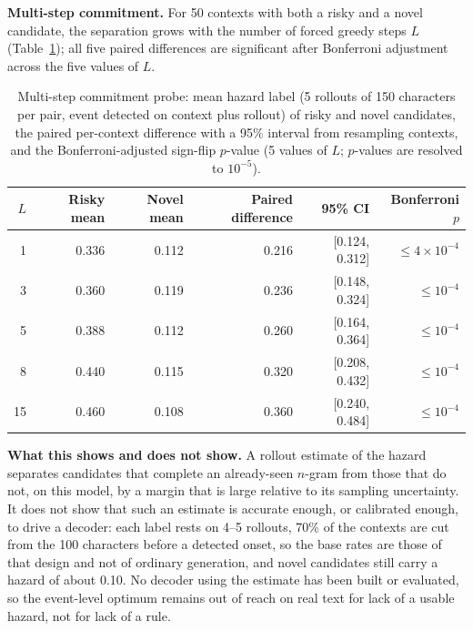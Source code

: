 \textbf{Multi-step commitment.} For 50 contexts with both a risky and a novel candidate, the separation grows with the number of forced greedy steps $L$ (Table~\ref{tab:hazardprobe}); all five paired differences are significant after Bonferroni adjustment across the five values of $L$.

\begin{table}[ht]
\centering
\caption{Multi-step commitment probe: mean hazard label (5 rollouts of 150 characters per pair, event detected on context plus rollout) of risky and novel candidates, the paired per-context difference with a 95\% interval from resampling contexts, and the Bonferroni-adjusted sign-flip $p$-value (5 values of $L$; $p$-values are resolved to $10^{-5}$).}
\label{tab:hazardprobe}
\begin{tabular}{@{}rrrrrr@{}}
\toprule
$L$ & Risky mean & Novel mean & Paired difference & 95\% CI & Bonferroni $p$ \\
\midrule
1  & 0.336 & 0.112 & 0.216 & [0.124, 0.312] & $\le4\times10^{-4}$ \\
3  & 0.360 & 0.119 & 0.236 & [0.148, 0.324] & $\le10^{-4}$ \\
5  & 0.388 & 0.112 & 0.260 & [0.164, 0.364] & $\le10^{-4}$ \\
8  & 0.440 & 0.115 & 0.320 & [0.208, 0.432] & $\le10^{-4}$ \\
15 & 0.460 & 0.108 & 0.360 & [0.240, 0.484] & $\le10^{-4}$ \\
\bottomrule
\end{tabular}
\end{table}

\textbf{What this shows and does not show.} A rollout estimate of the hazard separates candidates that complete an already-seen $n$-gram from those that do not, on this model, by a margin that is large relative to its sampling uncertainty. It does not show that such an estimate is accurate enough, or calibrated enough, to drive a decoder: each label rests on 4--5 rollouts, 70\% of the contexts are cut from the 100 characters before a detected onset, so the base rates are those of that design and not of ordinary generation, and novel candidates still carry a hazard of about 0.10. No decoder using the estimate has been built or evaluated, so the event-level optimum remains out of reach on real text for lack of a usable hazard, not for lack of a rule.

